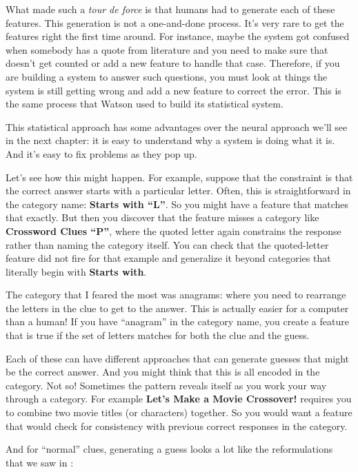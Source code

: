 What made \watson{} such a \textit{tour de force} is that humans had
to generate each of these features.
%
This generation is not a one-and-done process.
%
It's very rare to get the features right the first time around.
%
For instance, maybe the system got
confused when somebody has a quote from literature and you need to
make sure that doesn’t get counted or add a new feature to handle that
case.  
%
Therefore, if you are building a system to answer such questions, you
must look at things the system is still getting wrong and add a new
feature to correct the error.
%
This is the same process that Watson used to build its statistical system.

This statistical approach has some advantages over the neural approach
we'll see in the next chapter: it is easy to understand why a system
is doing what it is.
%
And it's easy to fix problems as they pop up.

Let's see how this might happen.
%
For example, suppose that the constraint is that the correct answer starts with a
particular letter.
%
Often, this is straightforward in the category name: \textbf{Starts
  with ``L''}.
%
So you might have a feature that matches that exactly.
%
But then you discover that the feature misses a category like
\textbf{Crossword Clues ``P''}, where the quoted letter again
constrains the response rather than naming the category itself.
%
You can check that the quoted-letter feature did not fire for that
example and generalize it beyond categories that literally begin with
\textbf{Starts with}.

The category that I feared the most was anagrams: where you need to
rearrange the letters in the clue to get to the answer.
%
This is actually easier for a computer than a human!
%
If you have ``anagram'' in the category name, you create a feature
that is true if the set of letters matches for both the clue and the guess.

Each of these can have different approaches that can generate guesses that
might be the correct answer.  And you might think that this is all encoded in
the category.  Not so!
%
Sometimes the pattern reveals itself as you work your way through a
category.  For example \textbf{Let's Make a Movie Crossover!} requires
you to combine two movie titles (or characters) together.
%
So you would want a feature that would check for consistency with
previous correct responses in the category.

And for ``normal'' clues, generating a guess looks a lot like the
reformulations that we saw in :

